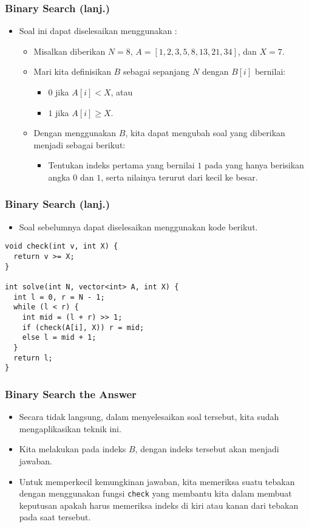 \begin{frame}
\frametitle{Binary Search (lanj.)}
\begin{itemize}
  \item Soal ini dapat diselesaikan menggunakan \fbinarySearch:
  \begin{itemize}
    \item Misalkan diberikan $N = 8$, $A = [1, 2, 3, 5, 8, 13, 21, 34]$, dan $X = 7$.
    \item Mari kita definisikan $B$ sebagai \farray sepanjang $N$ dengan $B[i]$ bernilai:
    \begin{itemize}
      \item $0$ jika $A[i] < X$, atau
      \item $1$ jika $A[i] \ge X$.
    \end{itemize}
    \item Dengan menggunakan \farray $B$, kita dapat mengubah soal yang diberikan menjadi sebagai berikut:
    \begin{itemize}
      \item Tentukan indeks pertama yang bernilai $1$ pada \farray yang hanya berisikan angka $0$ dan $1$, serta nilainya terurut dari kecil ke besar.
    \end{itemize}
  \end{itemize}
\end{itemize}
\end{frame}

\begin{frame}[fragile]
\frametitle{Binary Search (lanj.)}
\begin{itemize}
  \item Soal sebelumnya dapat diselesaikan menggunakan kode berikut.
\end{itemize}
\begin{lstlisting}
void check(int v, int X) {
  return v >= X;
}

int solve(int N, vector<int> A, int X) {
  int l = 0, r = N - 1;
  while (l < r) {
    int mid = (l + r) >> 1;
    if (check(A[i], X)) r = mid;
    else l = mid + 1;
  }
  return l;
}
\end{lstlisting}
\end{frame}

\begin{frame}
\frametitle{Binary Search the Answer}
\begin{itemize}
  \item Secara tidak langsung, dalam menyelesaikan soal tersebut, kita sudah mengaplikasikan teknik ini.
  \item Kita melakukan \fbinarySearch pada indeks \farray $B$, dengan indeks tersebut akan menjadi jawaban.
  \item Untuk memperkecil kemungkinan jawaban, kita memeriksa suatu tebakan dengan menggunakan fungsi \lstinline{check} yang membantu kita dalam membuat keputusan apakah harus memeriksa indeks di kiri atau kanan dari tebakan pada saat tersebut.
\end{itemize}
\end{frame}

